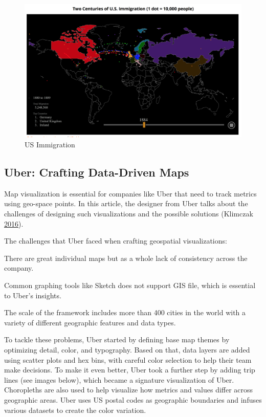 \documentclass[]{book}
\begin{document}
\begin{figure}
\centering
\includegraphics{images/immigration.png}
\caption{US Immigration}
\end{figure}

\hypertarget{uber-crafting-data-driven-maps}{%
\subsection{Uber: Crafting Data-Driven Maps}\label{uber-crafting-data-driven-maps}}

Map visualization is essential for companies like Uber that need to track metrics using geo-space points. In this article, the designer from Uber talks about the challenges of designing such visualizations and the possible solutions (Klimczak \protect\hyperlink{ref-uber_maps}{2016}).

The challenges that Uber faced when crafting geospatial visualizations:

There are great individual maps but as a whole lack of consistency across the company.

Common graphing tools like Sketch does not support GIS file, which is essential to Uber's insights.

The scale of the framework includes more than 400 cities in the world with a variety of different geographic features and data types.

To tackle these problems, Uber started by defining base map themes by optimizing detail, color, and typography. Based on that, data layers are added using scatter plots and hex bins, with careful color selection to help their team make decisions. To make it even better, Uber took a further step by adding trip lines (see images below), which became a signature visualization of Uber. Choropleths are also used to help visualize how metrics and values differ across geographic areas. Uber uses US postal codes as geographic boundaries and infuses various datasets to create the color variation.
\end{document}
